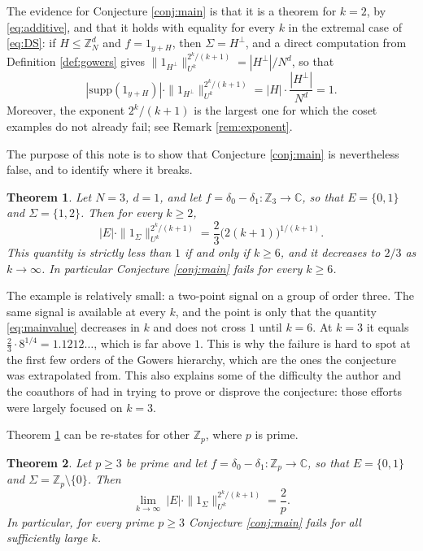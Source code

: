 \documentclass[12pt]{amsart}
\newcommand{\Z}{\mathbb{Z}}
\newcommand{\C}{\mathbb{C}}
\newcommand{\supp}{\mathrm{supp}}
\newtheorem{theorem}{Theorem}[section]
\begin{document}
The evidence for Conjecture \ref{conj:main} is that it is a theorem for $k=2$, by \eqref{eq:additive}, and that it holds with equality for every $k$ in the extremal case of \eqref{eq:DS}: if $H\le\Z_N^d$ and $f=1_{y+H}$, then $\Sigma=H^\perp$, and a direct computation from Definition \ref{def:gowers} gives $\|1_{H^\perp}\|_{U^k}^{2^k/(k+1)}=|H^\perp|/N^d$, so that
\[
|\supp(1_{y+H})|\cdot\|1_{H^\perp}\|_{U^k}^{2^k/(k+1)}=|H|\cdot\frac{|H^\perp|}{N^d}=1.
\]
Moreover, the exponent $2^k/(k+1)$ is the largest one for which the coset examples do not already fail; see Remark \ref{rem:exponent}.

The purpose of this note is to show that Conjecture \ref{conj:main} is nevertheless false, and to identify where it breaks.

\begin{theorem}\label{thm:main}
Let $N=3$, $d=1$, and let $f=\delta_0-\delta_1:\Z_3\to\C$, so that $E=\{0,1\}$ and $\Sigma=\{1,2\}$. Then for every $k\ge 2$,
\begin{equation}\label{eq:mainvalue}
|E|\cdot\|1_\Sigma\|_{U^k}^{2^k/(k+1)}
=
\frac{2}{3}\bigl(2(k+1)\bigr)^{1/(k+1)} .
\end{equation}
This quantity is strictly less than $1$ if and only if $k\ge 6$, and it decreases to $2/3$ as $k\to\infty$. In particular Conjecture \ref{conj:main} fails for every $k\ge6$.
\end{theorem}

The example is relatively small: a two-point signal on a group of order three. The same signal is available at every $k$, and the point is only that the quantity \eqref{eq:mainvalue} decreases in $k$ and does not cross $1$ until $k=6$. At $k=3$ it equals $\tfrac23\cdot 8^{1/4}=1.1212\ldots$, which is far above $1$. This is why the failure is hard to spot at the first few orders of the Gowers hierarchy, which are the ones the conjecture was extrapolated from. This also explains some of the difficulty the author and the coauthors of \cite{RefinedUncertainty} had in trying to prove or disprove the conjecture: those efforts were largely focused on $k=3.$

Theorem \ref{thm:main} can be re-states for other $\mathbb{Z}_p$, where $p$ is prime.

\begin{theorem}\label{thm:allp}
Let $p\ge3$ be prime and let $f=\delta_0-\delta_1:\Z_p\to\C$, so that $E=\{0,1\}$ and $\Sigma=\Z_p\setminus\{0\}$. Then
\[
\lim_{k\to\infty}\ |E|\cdot\|1_\Sigma\|_{U^k}^{2^k/(k+1)}=\frac2p .
\]
In particular, for every prime $p\ge3$ Conjecture \ref{conj:main} fails for all sufficiently large $k$.
\end{theorem}
\end{document}
